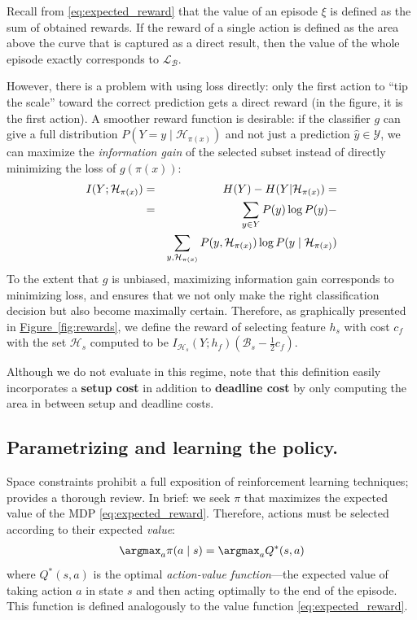 Recall from \eqref{eq:expected_reward} that the value of an episode $\xi$ is defined as the sum of obtained rewards.
If the reward of a single action is defined as the area above the curve that is captured as a direct result, then the value of the whole episode exactly corresponds to $\mathcal{L}_\mathcal{B}$.

However, there is a problem with using loss directly: only the first action to ``tip the scale'' toward the correct prediction gets a direct reward (in the figure, it is the first action).  A smoother reward function is desirable:
if the classifier $g$ can give a full distribution $P(Y = y \mid \mathcal{H}_{\pi(x)})$ and not just a prediction $\hat{y} \in \mathcal{Y}$, we can maximize the \emph{information gain} of the selected subset instead of directly minimizing the loss of $g(\pi(x))$:
\begin{eqnarray}
I(Y; \mathcal{H}_{\pi(x)}) &=& H(Y) - H(Y | \mathcal{H}_{\pi(x)}) = \\ \notag
&=& \sum_{y \in Y} P(y) \log P(y) -  \\ \notag
&&\sum_{y, \mathcal{H}_{\pi(x)}} P(y, \mathcal{H}_{\pi(x)}) \log P(y \mid \mathcal{H}_{\pi(x)})
\end{eqnarray}
To the extent that $g$ is unbiased, maximizing information gain corresponds to minimizing loss, and ensures that we not only make the right classification decision but also become maximally certain.
Therefore, as graphically presented in \hyperref[fig:rewards]{Figure~\ref*{fig:rewards}}, we define the reward of selecting feature $h_s$ with cost $c_f$ with the set $\mathcal{H}_s$ computed to be $I_{\mathcal{H}_s}(Y; h_f) (\mathcal{B}_s - \frac{1}{2}c_f)$.

Although we do not evaluate in this regime, note that this definition easily incorporates a \textbf{setup cost} in addition to \textbf{deadline cost} by only computing the area in between setup and deadline costs.

\subsection{Parametrizing and learning the policy.}

Space constraints prohibit a full exposition of reinforcement learning techniques; \parencite{Sutton1998} provides a thorough review.
In brief: we seek $\pi$ that maximizes the expected value of the MDP \eqref{eq:expected_reward}.
Therefore, actions must be selected according to their expected \emph{value}:
\begin{align*}
\argmax_a \pi(a \mid s) = \argmax_a Q^*(s,a)
\end{align*}
where $Q^*(s,a)$ is the optimal \emph{action-value function}---the expected value of taking action $a$ in state $s$ and then acting optimally to the end of the episode.
This function is defined analogously to the value function \eqref{eq:expected_reward}.

